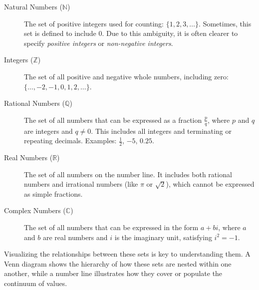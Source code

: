 \begin{description}
    \item[Natural Numbers ($\mathbb{N}$)] The set of positive integers used for counting: $\{1, 2, 3, \dots\}$. Sometimes, this set is defined to include $0$. Due to this ambiguity, it is often clearer to specify \textit{positive integers} or \textit{non-negative integers}.

    \item[Integers ($\mathbb{Z}$)] The set of all positive and negative whole numbers, including zero: $\{\dots, -2, -1, 0, 1, 2, \dots\}$.

    \item[Rational Numbers ($\mathbb{Q}$)] The set of all numbers that can be expressed as a fraction $\frac{p}{q}$, where $p$ and $q$ are integers and $q \neq 0$. This includes all integers and terminating or repeating decimals. Examples: $\frac{1}{2}$, $-5$, $0.25$.

    \item[Real Numbers ($\mathbb{R}$)] The set of all numbers on the number line. It includes both rational numbers and irrational numbers (like $\pi$ or $\sqrt{2}$), which cannot be expressed as simple fractions.
    
    \item[Complex Numbers ($\mathbb{C}$)] The set of all numbers that can be expressed in the form $a + bi$, where $a$ and $b$ are real numbers and $i$ is the imaginary unit, satisfying $i^2 = -1$.
\end{description}

Visualizing the relationships between these sets is key to understanding them. A Venn diagram shows the hierarchy of how these sets are nested within one another, while a number line illustrates how they cover or populate the continuum of values.

